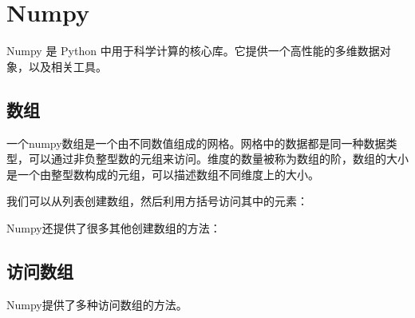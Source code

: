 \section{Numpy}
\begin{frame}

Numpy 是 Python 中用于科学计算的核心库。它提供一个高性能的多维数据对象，以及相关工具。 
\end{frame}

\subsection{数组}
\begin{frame}


%

一个numpy数组是一个由不同数值组成的网格。网格中的数据都是同一种数据类型，可以通过非负整型数的元组来访问。维度的数量被称为数组的阶，数组的大小是一个由整型数构成的元组，可以描述数组不同维度上的大小。
\end{frame}

\begin{frame}
我们可以从列表创建数组，然后利用方括号访问其中的元素：



\end{frame}

\begin{frame}


Numpy还提供了很多其他创建数组的方法：

\end{frame}

\subsection{访问数组}

\begin{frame}

%

Numpy提供了多种访问数组的方法。
\end{frame}

